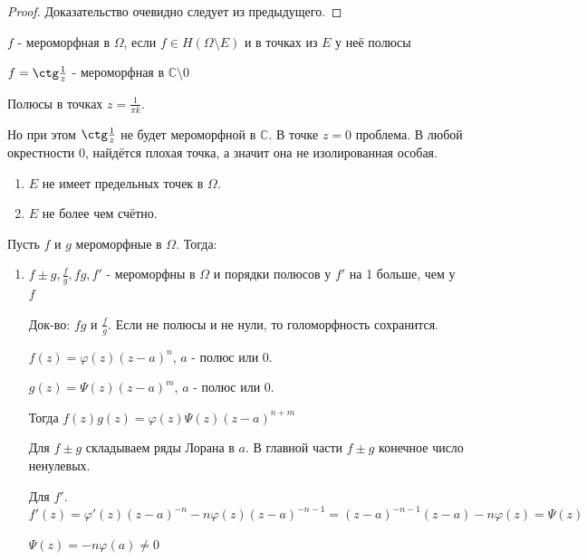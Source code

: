 \begin{proof}
    Доказательство очевидно следует из предыдущего. 
\end{proof}

\begin{definition}
    $f$ - мероморфная в $\Omega$, если $f \in H(\Omega \setminus E)$ и в точках из $E$ у неё полюсы 
\end{definition}

\begin{example}
    $f = \ctg \frac{1}{z}$  - мероморфная в $\mathbb{C} \setminus 0$

    Полюсы в точках $z = \frac{1}{\pi k}$.

    Но при этом $\ctg \frac{1}{z}$ не будет мероморфной в $\mathbb{C}$. В точке $z = 0$ проблема.
    В любой окрестности 0, найдётся плохая точка, а значит она не изолированная особая.
\end{example}

\begin{remark}
    \begin{enumerate}
        \item $E$ не имеет предельных точек в $\Omega$. 
        \item $E$ не более чем счётно.
    \end{enumerate}
\end{remark}

\begin{properties}
    Пусть $f$ и $g$ мероморфные в $\Omega$. Тогда:

    \begin{enumerate}
        \item $f \pm g, \frac{f}{g}, fg, f'$ - мероморфны в $\Omega$ и порядки полюсов у $f'$ на 1 больше, чем у $f$
        
        Док-во: $fg$ и $\frac{f}{g}$. Если не полюсы и не нули, то голоморфность сохранится.
        
        $f(z) = \varphi (z) (z - a)^n$, $a$ - полюс или 0. 
        
        $g(z) = \varPsi (z) (z - a)^m$, $a$ - полюс или 0.

        Тогда $f(z)g(z) = \varphi (z) \varPsi (z) (z - a)^{n + m}$

        Для $f \pm g$ складываем ряды Лорана в $a$. В главной части $f \pm g$ конечное число ненулевых.

        Для $f'$. $f'(z) = \varphi' (z) (z - a)^{-n} - n \varphi (z) (z - a)^{-n - 1} = (z - a)^{-n - 1}(z - a) - n\varphi (z) = \varPsi (z)$

        $\varPsi (z) = -n \varphi (a) \neq 0$
    \end{enumerate}
\end{properties}

